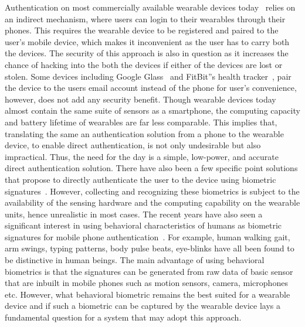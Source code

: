 \vspace{1mm}
Authentication on most commercially available wearable devices
today~\cite{fitbit, smartwatch} relies on an indirect mechanism, where users
can login to their wearables through their phones. This requires the wearable
device to be registered and paired to the user's mobile device, which makes it
inconvenient as the user has to carry both the devices. The security of this 
approach is also in question as it increases the chance of hacking into the 
both the devices if either of the devices are lost or stolen. 
Some devices including Google Glass~\cite{googleglass} and 
FitBit''s health tracker~\cite{fitbit}, pair the device to the users email
account instead of the phone for user's convenience, however, does not add any 
security benefit. Though wearable devices today almost contain the same suite 
of sensors as a smartphone, the computing capacity and battery lifetime of 
wearables are far less comparable. This implies that, translating the same 
an authentication solution from a phone to the wearable device, to enable 
direct authentication, is not only undesirable but also impractical.
Thus, the need for the day is a simple, low-power, and accurate
direct authentication solution.
There have also been a few specific point solutions that propose to directly
authenticate the user to the device using biometric signatures~\cite{mobisys 
papers,etc}. However, collecting and recognizing these biometrics is subject 
to the availability of the sensing hardware and the computing capability on 
the wearable units, hence unrealistic in most 
cases. The recent years have also seen a significant interest in using 
behavioral characteristics of humans as biometric signatures for mobile phone 
authentication~\cite{stevenage1999visual,okumura2006study,monrose2000keystroke,jorgensen2011mouse,bo2013silentsense,de2012touch}.
For example, human walking gait, arm swings, typing patterns, body pulse 
beats, eye-blinks have all been found to be distinctive in human beings. 
The main advantage of using behavioral biometrics is that the signatures can 
be generated from raw data of basic sensor that are inbuilt in mobile phones 
such as motion sensors, camera, microphones etc.
However, what behavioral biometric remains the best suited for a wearable 
device and if such a biometric can be captured by the wearable device lays a 
fundamental question for a system that may adopt this approach. 

